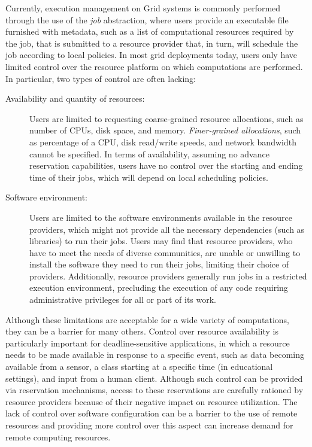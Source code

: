 Currently, execution management on Grid systems is commonly performed through the use of the \emph{job} abstraction, where users provide an executable file furnished with metadata, such as a list of computational resources required by the job, that is submitted to a resource provider that, in turn, will schedule the job according to local policies. In most grid deployments today, users only have limited control over the resource platform on which computations are performed. In particular, two types of control are often lacking:

\begin{description}
\item[Availability and quantity of resources:] Users are limited to requesting coarse-grained resource allocations, such as number of CPUs, disk space, and memory. \emph{Finer-grained allocations}, such as percentage of a CPU, disk read/write speeds, and network bandwidth cannot be specified. In terms of availability, assuming no advance reservation capabilities, users have no control over the starting and ending time of their jobs, which will depend on local scheduling policies.
\item[Software environment:] Users are limited to the software environments available in the resource providers, which might not provide all the necessary dependencies (such as libraries) to run their jobs. Users may find that resource providers, who have to meet the needs of diverse communities, are unable or unwilling to install the software they need to run their jobs, limiting their choice of providers. Additionally, resource providers generally run jobs in a restricted execution environment, precluding the execution of any code requiring administrative privileges for all or part of its work.
\end{description}

Although these limitations are acceptable for a wide variety of computations, they can be a barrier for many others. Control over resource availability is particularly important for deadline{}-sensitive applications, in which a resource needs to be made available in response to a specific event, such as data becoming available from a sensor, a class starting at a specific time (in educational settings), and input from a human client. Although such control can be provided via reservation mechanisms, access to these reservations are carefully rationed by resource providers because of their negative impact on resource utilization. The lack of control over software configuration can be a barrier to the use of remote resources and providing more control over this aspect can increase demand for remote computing resources.

